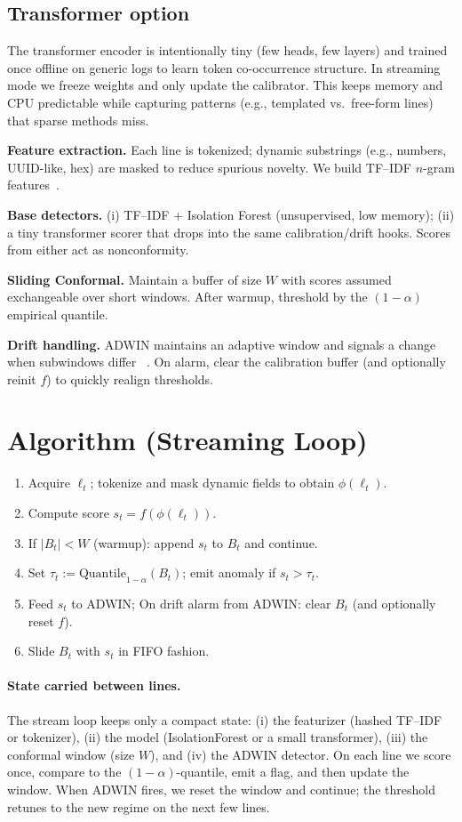 \documentclass[10pt,twocolumn]{article}
\begin{document}
\subsection*{Transformer option}

The transformer encoder is intentionally tiny (few heads, few layers) and trained once offline on generic logs to learn token co-occurrence structure. In streaming mode we freeze weights and only update the calibrator. This keeps memory and CPU predictable while capturing patterns (e.g., templated vs.\ free-form lines) that sparse methods miss.

\textbf{Feature extraction.} Each line is tokenized; dynamic substrings (e.g., numbers, UUID-like, hex) are masked to reduce spurious novelty. We build TF--IDF $n$-gram features~\cite{salton1988tfidf}.

\textbf{Base detectors.} (i) TF--IDF + Isolation Forest (unsupervised, low memory); (ii) a tiny transformer scorer that drops into the same calibration/drift hooks. Scores from either act as nonconformity.

\textbf{Sliding Conformal.} Maintain a buffer of size $W$ with scores assumed exchangeable over short windows. After warmup, threshold by the $(1-\alpha)$ empirical quantile.

\textbf{Drift handling.} ADWIN maintains an adaptive window and signals a change when subwindows differ ~\cite{bifet2007adwin}. On alarm, clear the calibration buffer (and optionally reinit $f$) to quickly realign thresholds.
\section{Algorithm (Streaming Loop)}
\begin{enumerate}[leftmargin=*]
  \item Acquire $\ell_t$; tokenize and mask dynamic fields to obtain $\phi(\ell_t)$.
  \item Compute score $s_t=f(\phi(\ell_t))$.
  \item If $|B_t|<W$ (warmup): append $s_t$ to $B_t$ and continue.
  \item Set $\tau_t := \mathrm{Quantile}_{1-\alpha}(B_t)$; emit anomaly if $s_t>\tau_t$.
  \item Feed $s_t$ to ADWIN; On drift alarm from ADWIN: clear $B_t$ (and optionally reset $f$).
  \item Slide $B_t$ with $s_t$ in FIFO fashion.
\end{enumerate}
\paragraph{State carried between lines.} The stream loop keeps only a compact state: (i) the featurizer (hashed TF--IDF or tokenizer), (ii) the model (IsolationForest or a small transformer), (iii) the conformal window (size $W$), and (iv) the ADWIN detector. On each line we score once, compare to the $(1{-}\alpha)$-quantile, emit a flag, and then update the window. When ADWIN fires, we reset the window and continue; the threshold retunes to the new regime on the next few lines.
\end{document}
